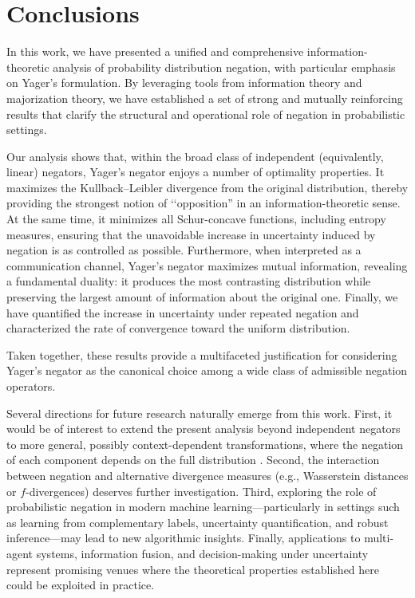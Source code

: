 \documentclass[pdflatex,sn-basic,iicol]{sn-jnl}%
\theoremstyle{thmstyleone}%
\theoremstyle{thmstyletwo}%
\theoremstyle{thmstylethree}%
\begin{document}
\section{Conclusions}
In this work, we have presented a unified and comprehensive information-theoretic analysis of probability distribution negation, with particular emphasis on Yager’s formulation. By leveraging tools from information theory and majorization theory, we have established a set of strong and mutually reinforcing results that clarify the structural and operational role of negation in probabilistic settings.

Our analysis shows that, within the broad class of independent (equivalently, linear) negators, Yager’s negator enjoys a number of optimality properties. It maximizes the Kullback–Leibler divergence from the original distribution, thereby providing the strongest notion of \lq\lq opposition” in an information-theoretic sense. At the same time, it minimizes all Schur-concave functions, including entropy measures, ensuring that the unavoidable increase in uncertainty induced by negation is as controlled as possible. Furthermore, when interpreted as a communication channel, Yager’s negator maximizes mutual information, revealing a fundamental duality: it produces the most contrasting distribution while preserving the largest amount of information about the original one. Finally, we have quantified the increase in uncertainty under repeated negation and characterized the rate of convergence toward the uniform distribution.

Taken together, these results provide a  multifaceted justification for considering Yager’s negator as the canonical choice among a wide class of admissible negation operators.

Several directions for future research naturally emerge from this work. First, it would be of interest to extend the present analysis beyond independent negators to more general, possibly context-dependent transformations, where the negation of each component depends on the full distribution \citep{batyrshin2021negations, Wu_exp, Zhang}. Second, the interaction between negation and alternative divergence measures (e.g., Wasserstein distances or $f$-divergences) deserves further investigation. Third, exploring the role of probabilistic negation in modern machine learning—particularly in settings such as learning from complementary labels, uncertainty quantification, and robust inference—may lead to new algorithmic insights. Finally, applications to multi-agent systems, information fusion, and decision-making under uncertainty represent promising venues where the theoretical properties established here could be exploited in practice.


\backmatter




\end{document}

